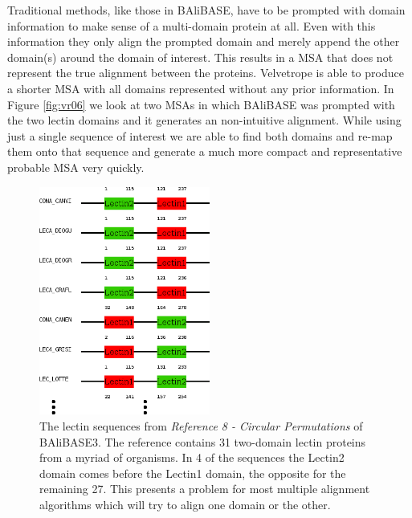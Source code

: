 \documentclass[phd,tocprelim]{cornell}
\begin{document}
Traditional methods, like those in BAliBASE, have to be prompted with domain information to make sense of a multi-domain protein at all. Even with this information they only align the prompted domain and merely append the other domain(s) around the domain of interest. This results in a MSA that does not represent the true alignment between the proteins. Velvetrope is able to produce a shorter MSA with all domains represented without any prior information. In Figure \ref{fig:vr06} we look at two MSAs in which BAliBASE was prompted with the two lectin domains and it generates an non-intuitive alignment. While using just a single sequence of interest we are able to find both domains and re-map them onto that sequence and generate a much more compact and representative probable MSA very quickly.

 \begin{figure}[htp]%
 \centerline{\includegraphics[width=0.5\textwidth]{figures/velvetrope/BAliBASEsnap2v2.png}}
 \caption[Multiple alignment reference]{The lectin sequences from \textit{Reference 8 - Circular Permutations} of BAliBASE3. The reference contains 31 two-domain lectin proteins from a myriad of organisms. In 4 of the sequences the Lectin2 domain comes before the Lectin1 domain, the opposite for the remaining 27. This presents a problem for most multiple alignment algorithms which will try to align one domain or the other.}
 	\label{fig:vr04}
 \end{figure}
 
\end{document}

